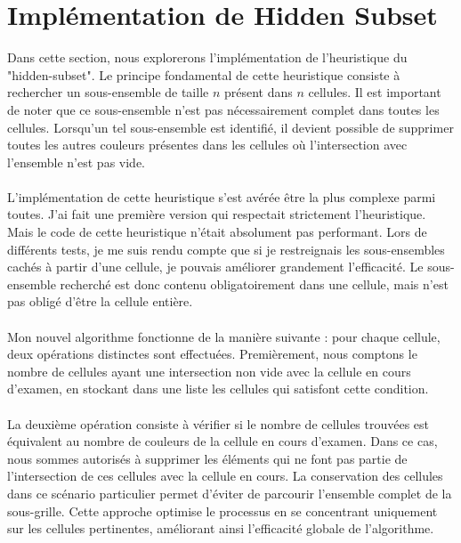 \documentclass{article}
\begin{document}
\section{Implémentation de Hidden Subset}
Dans cette section, nous explorerons l'implémentation de l'heuristique du \\ 
"hidden-subset". Le principe fondamental de cette heuristique consiste à \\ 
rechercher un sous-ensemble de taille $n$ présent dans $n$ cellules. Il est 
important de noter que ce sous-ensemble n'est pas nécessairement complet dans 
toutes les cellules. Lorsqu'un tel sous-ensemble est identifié, il devient 
possible de supprimer toutes les autres couleurs présentes dans les cellules 
où l'intersection avec l'ensemble n'est pas vide.
\\ \\
L'implémentation de cette heuristique s'est avérée être la plus complexe parmi 
toutes. J'ai fait une première version qui respectait strictement l'heuristique.
Mais le code de cette heuristique n'était absolument pas performant. Lors de 
différents tests, je me suis rendu compte que si je restreignais les 
sous-ensembles cachés à partir d'une cellule, je pouvais améliorer grandement 
l'efficacité. Le sous-ensemble recherché est donc contenu obligatoirement dans 
une cellule, mais n'est pas obligé d'être la cellule entière.
\\ \\
Mon nouvel algorithme fonctionne de la manière suivante : pour chaque cellule, 
deux opérations distinctes sont effectuées. Premièrement, nous comptons le 
nombre de cellules ayant une intersection non vide avec la cellule en cours 
d'examen, en stockant dans une liste les cellules qui satisfont cette condition. 
\\ \\
La deuxième opération consiste à vérifier si le nombre de cellules trouvées est
équivalent au nombre de couleurs de la cellule en cours d'examen. Dans ce cas,
nous sommes autorisés à supprimer les éléments qui ne font pas partie de 
l'intersection de ces cellules avec la cellule en cours. La conservation des 
cellules dans ce scénario particulier permet d'éviter de parcourir l'ensemble 
complet de la sous-grille. Cette approche optimise le processus en se 
concentrant uniquement sur les cellules pertinentes, améliorant ainsi 
l'efficacité globale de l'algorithme.
\\ \\
\end{document}
